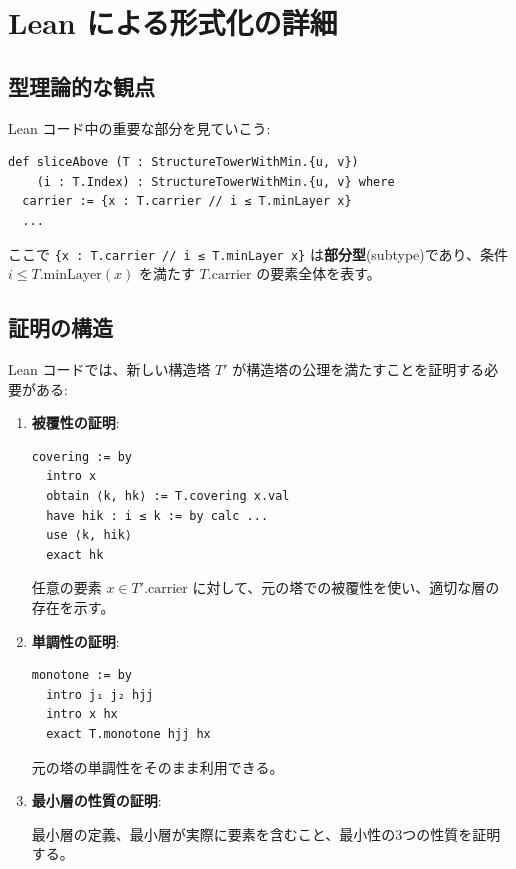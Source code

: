 \documentclass[a4paper,11pt]{article}
\theoremstyle{definition}
\begin{document}
\section{Lean による形式化の詳細}

\subsection{型理論的な観点}

Lean コード中の重要な部分を見ていこう:

\begin{verbatim}
def sliceAbove (T : StructureTowerWithMin.{u, v}) 
    (i : T.Index) : StructureTowerWithMin.{u, v} where
  carrier := {x : T.carrier // i ≤ T.minLayer x}
  ...
\end{verbatim}

ここで \texttt{\{x : T.carrier // i ≤ T.minLayer x\}} は\textbf{部分型}(subtype)であり、条件 $i \leq T.\text{minLayer}(x)$ を満たす $T.\text{carrier}$ の要素全体を表す。

\subsection{証明の構造}

Lean コードでは、新しい構造塔 $T'$ が構造塔の公理を満たすことを証明する必要がある:

\begin{enumerate}
    \item \textbf{被覆性の証明}:
    \begin{verbatim}
covering := by
  intro x
  obtain ⟨k, hk⟩ := T.covering x.val
  have hik : i ≤ k := by calc ...
  use ⟨k, hik⟩
  exact hk
    \end{verbatim}
    
    任意の要素 $x \in T'.\text{carrier}$ に対して、元の塔での被覆性を使い、適切な層の存在を示す。
    
    \item \textbf{単調性の証明}:
    \begin{verbatim}
monotone := by
  intro j₁ j₂ hjj
  intro x hx
  exact T.monotone hjj hx
    \end{verbatim}
    
    元の塔の単調性をそのまま利用できる。
    
    \item \textbf{最小層の性質の証明}:
    
    最小層の定義、最小層が実際に要素を含むこと、最小性の3つの性質を証明する。
\end{enumerate}
\end{document}
